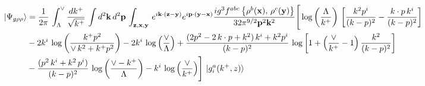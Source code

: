 \documentclass[aps,prd,amsmath,amssymb,nofootinbib]{revtex4-2}
\def\v#1{\mathbf{#1}}
\numberwithin{equation}{section}
\begin{document}
\begin{align}\label{combinedgrhorhopos}
    \left|\Psi_{g\rho\rho}\right\rangle & =  \frac{1}{2\pi}\,\int_{\Lambda}^{\vee}\frac{dk^{+}}{\sqrt{k^{+}}}\,\int d^{2}\mathbf{k}\, d^{2}\mathbf{p}\,\int_{\v{z},\v{x},\v{y}}\, e^{i\v{k}\cdot (\v{z}-\v{y})} e^{i\v{p}\cdot (\v{y}-\v{x})}\frac{ig^{3}f^{abc}\left\{ \rho^{b}(\mathbf{x}),\,\rho^{c}(\mathbf{y})\right\}}{32\pi^{9/2}\mathbf{p}^{2}\mathbf{k}^{2}}\Bigg[\log{\left(\frac{\Lambda}{k^{+}}\right)}\,\left[\frac{k^{2}p^{i}}{(k-p)^{2}}-\frac{k\cdot p\,k^{i}}{(k-p)^{2}}\right]\notag \\ & -2k^{i}\,\log{\left(\frac{k^{+}p^{2}}{\vee\, k^{2}+k^{+}p^{2}}\right)}-2k^{i}\,\log{\left(\frac{\vee}{\Lambda}\right)}+\frac{(2p^{2}-2\,k\cdot p + k^{2})\,k^{i} + k^{2}p^{i}}{(k-p)^{2}}\, \log{\left[1+\left(\frac{\vee}{k^{+}}-1\right)\frac{k^{2}}{(k-p)^{2}}\right]}\notag \\ & - \frac{(p^{2}\,k^{i}+k^{2}\,p^{i})}{(k-p)^{2}}\, \log{\left(\frac{\vee - k^{+}}{\Lambda}\right)}-k^{i}\, \log{\left(\frac{\vee}{k^{+}}\right)}\Bigg]\, \ket{g^{a}_{i}(k^{+},z)}
\end{align}
\end{document}
